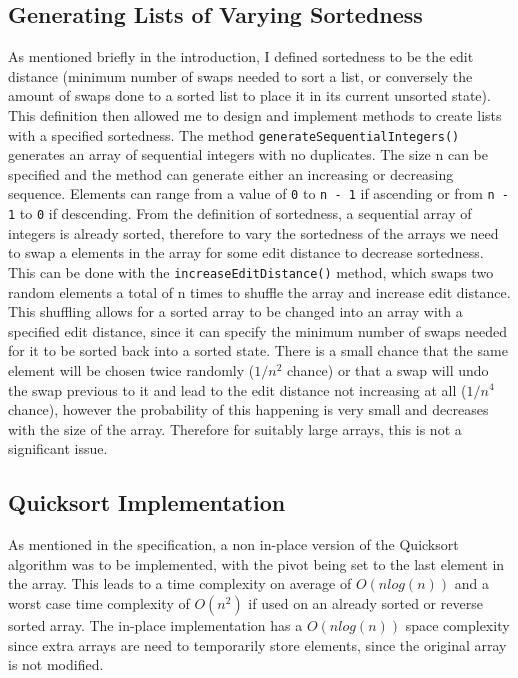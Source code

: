 \documentclass{article}
\begin{document}
\subsection{Generating Lists of Varying Sortedness}
As mentioned briefly in the introduction, I defined sortedness to be the edit distance (minimum number of swaps needed to sort a list, or conversely the amount of swaps done to a sorted list to place it in its current unsorted state). This definition then allowed me to design and implement methods to create lists with a specified sortedness. The method \verb+generateSequentialIntegers()+ generates an array of sequential integers with no duplicates. The size n can be specified and the method can generate either an increasing or decreasing sequence. Elements can range from a value of \verb+0+ to \verb+n - 1+ if ascending or from \verb+n - 1+ to \verb+0+ if descending. From the definition of sortedness, a sequential array of integers is already sorted, therefore to vary the sortedness of the arrays we need to swap a elements in the array for some edit distance to decrease sortedness. This can be done with the \verb+increaseEditDistance()+ method, which swaps two random elements a total of n times to shuffle the array and increase edit distance. This shuffling allows for a sorted array to be changed into an array with a specified edit distance, since it can specify the minimum number of swaps needed for it to be sorted back into a sorted state. There is a small chance that the same element will be chosen twice randomly ($1/n^2$ chance) or that a swap will undo the swap previous to it and lead to the edit distance not increasing at all ($1/n^4$ chance), however the probability of this happening is very small and decreases with the size of the array. Therefore for suitably large arrays, this is not a significant issue.

\subsection{Quicksort Implementation}
As mentioned in the specification, a non in-place version of the Quicksort algorithm was to be implemented, with the pivot being set to the last element in the array. This leads to a time complexity on average of $O(nlog(n))$ and a worst case time complexity of $O(n^2)$ if used on an already sorted or reverse sorted array. The in-place implementation has a $O(nlog(n))$ space complexity since extra arrays are need to temporarily store elements, since the original array is not modified.
\end{document}
